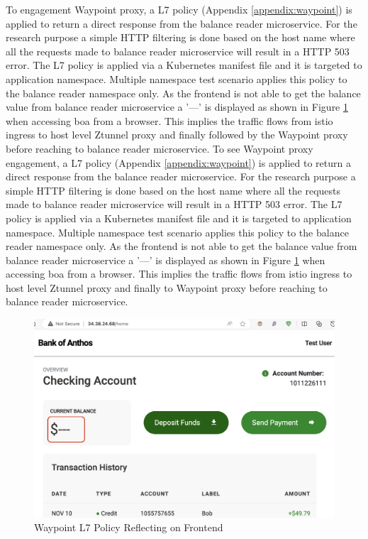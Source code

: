 To engagement Waypoint proxy, a L7 policy (Appendix \ref{appendix:waypoint}) is applied to return a direct response from the balance reader microservice. For the research purpose a simple HTTP filtering is done based on the host name where all the requests made to balance reader microservice will result in a HTTP 503 error. The L7 policy is applied via a Kubernetes manifest file and it is targeted to application namespace. Multiple namespace test scenario applies this policy to the balance reader namespace only. As the frontend is not able to get the balance value from balance reader microservice a '---' is displayed as shown in Figure \ref{method:l7PolicyAppliedView} when accessing \acrshort{boa} from a browser. This implies the traffic flows from istio ingress to host level Ztunnel proxy and finally followed by the Waypoint proxy before reaching to balance reader microservice.
To see Waypoint proxy engagement, a L7 policy (Appendix \ref{appendix:waypoint}) is applied to return a direct response from the balance reader microservice. For the research purpose a simple HTTP filtering is done based on the host name where all the requests made to balance reader microservice will result in a HTTP 503 error. The L7 policy is applied via a Kubernetes manifest file and it is targeted to application namespace. Multiple namespace test scenario applies this policy to the balance reader namespace only. As the frontend is not able to get the balance value from balance reader microservice a '---' is displayed as shown in Figure \ref{method:l7PolicyAppliedView} when accessing \acrshort{boa} from a browser. This implies the traffic flows from istio ingress to host level Ztunnel proxy and finally to Waypoint proxy before reaching to balance reader microservice.

\begin{figure}[ht!]
  \centering
  \includegraphics[width=0.7\linewidth]{resources/l7-policy-applied.png}
  \caption{Waypoint L7 Policy Reflecting on Frontend}
  \label{method:l7PolicyAppliedView}
\end{figure}

